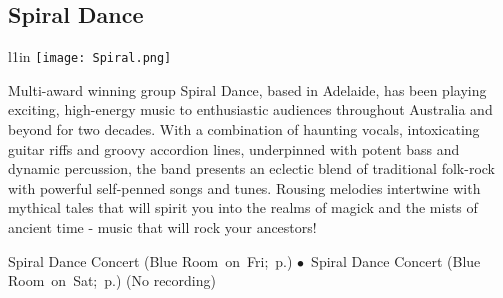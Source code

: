 \subsection{Spiral Dance} 

\begingroup
 \begin{wrapfigure}{l}{1in}
  \texttt{[image: Spiral.png]} %
  \end{wrapfigure}

{ Multi-award winning group Spiral Dance, based in Adelaide, has been playing exciting,
high-energy music to enthusiastic audiences throughout Australia and beyond for two
decades. With a combination of haunting vocals, intoxicating guitar riffs and groovy
accordion lines, underpinned with potent bass and dynamic percussion, the band presents
an eclectic blend of traditional folk-rock with powerful self-penned songs and tunes.
Rousing melodies intertwine with mythical tales that will spirit you into the realms of magick
and the mists of ancient time - music that will rock your ancestors!
  

} \hspace{2em} {\footnotesize Spiral Dance Concert (Blue Room~on~Fri;~p.\pageref{Fri-Concert1}) $\bullet$~Spiral Dance Concert (Blue Room~on~Sat;~p.\pageref{Sat-Concert2})}
 {\small (No recording)} 


\endgroup

\vspace{6pt}
